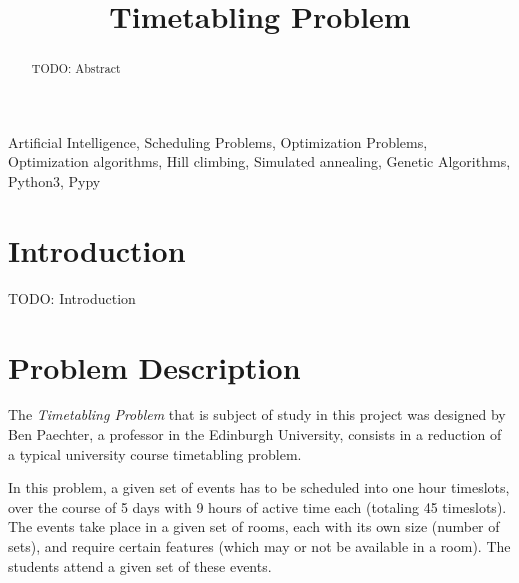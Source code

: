 \documentclass[conference]{IEEEtran}
\begin{document}
\title{Timetabling Problem}

\author{
\and
{}
\and
{}
}

\maketitle

\begin{abstract}
TODO: Abstract
\end{abstract}

\begin{IEEEkeywords}
Artificial Intelligence, Scheduling Problems, Optimization Problems, Optimization algorithms, Hill climbing, Simulated annealing, Genetic Algorithms, Python3, Pypy
\end{IEEEkeywords}

\section{Introduction}

TODO: Introduction

\section{Problem Description}

The \textit{Timetabling Problem} that is subject of study in this project was designed by Ben Paechter, a professor in the Edinburgh University, consists in a reduction of a typical university course timetabling problem.

In this problem, a given set of events has to be scheduled into one hour timeslots, over the course of 5 days with 9 hours of active time each (totaling 45 timeslots). The events take place in a given set of rooms, each with its own size (number of sets), and require certain features (which may or not be available in a room). The students attend a given set of these events. 
\end{document}
